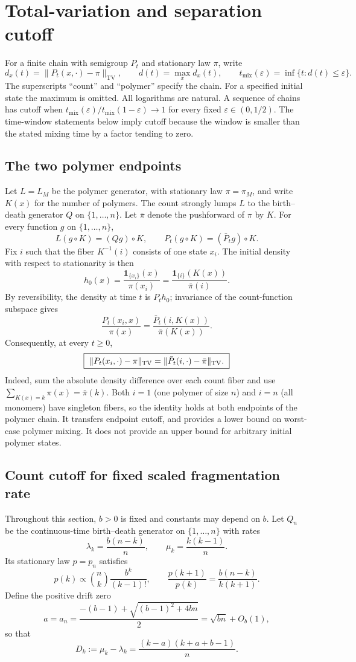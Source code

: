\section{Total-variation and separation cutoff}\label{sec:count-cutoff}

For a finite chain with semigroup $P_t$ and stationary law $\pi$, write
\[
 d_x(t)=\|P_t(x,\cdot)-\pi\|_{\mathrm{TV}},\qquad
 d(t)=\max_x d_x(t),\qquad
 t_{\mathrm{mix}}(\varepsilon)=\inf\{t:d(t)\le\varepsilon\}.
\]
The superscripts ``count'' and ``polymer'' specify the chain. For a
specified initial state the maximum is omitted. All logarithms are
natural. A sequence of chains has cutoff when
$t_{\mathrm{mix}}(\varepsilon)/t_{\mathrm{mix}}(1-\varepsilon)\to1$ for every
fixed $\varepsilon\in(0,1/2)$. The time-window statements below imply cutoff because the
window is smaller than the stated mixing time by a factor tending to
zero.

\subsection{The two polymer endpoints}
Let $L=L_M$ be the polymer generator, with stationary law $\pi=\pi_M$,
and write $K(x)$ for the number of polymers. The count strongly lumps
$L$ to the birth--death generator $Q$ on $\{1,\ldots,n\}$. Let $\bar\pi$ denote the pushforward of $\pi$ by $K$.
For every function $g$ on $\{1,\ldots,n\}$,
\[
 L(g\circ K)=(Qg)\circ K,
 \qquad P_t(g\circ K)=(\bar P_tg)\circ K.
\]
Fix $i$ such that the fiber $K^{-1}(i)$ consists of one state $x_i$.
The initial density with respect to stationarity is then
\[
 h_0(x)=\frac{\mathbf1_{\{x_i\}}(x)}{\pi(x_i)}
       =\frac{\mathbf1_{\{i\}}(K(x))}{\bar\pi(i)}.
\]
By reversibility, the density at time $t$ is $P_th_0$; invariance of the
count-function subspace gives
\[
 \frac{P_t(x_i,x)}{\pi(x)}
 =\frac{\bar P_t(i,K(x))}{\bar\pi(K(x))}.
\]
Consequently, at every $t\geq0$,
\[
 \boxed{\ \|P_t(x_i,\cdot)-\pi\|_{\rm TV}
       =\|\bar P_t(i,\cdot)-\bar\pi\|_{\rm TV}.\ }
\]
Indeed, sum the absolute density difference over each count fiber and use
$\sum_{K(x)=k}\pi(x)=\bar\pi(k)$. Both $i=1$ (one polymer of size $n$)
and $i=n$ (all monomers) have singleton fibers, so the identity holds at
both endpoints of the polymer chain. It transfers endpoint cutoff, and
provides a lower bound on worst-case polymer mixing. It does not provide
an upper bound for arbitrary initial polymer states.


\subsection{Count cutoff for fixed scaled fragmentation rate}
Throughout this section, $b>0$ is fixed and constants may depend on $b$.
Let $Q_n$ be the continuous-time birth--death generator on $\{1,\ldots,n\}$
with rates
\[
 \lambda_k=\frac{b(n-k)}n,\qquad \mu_k=\frac{k(k-1)}n.
\]
Its stationary law $p=p_n$ satisfies
\[
 p(k)\propto \binom nk\frac{b^k}{(k-1)!},\qquad
 \frac{p(k+1)}{p(k)}=\frac{b(n-k)}{k(k+1)}.
\]
Define the positive drift zero
\[
 a=a_n=\frac{-(b-1)+\sqrt{(b-1)^2+4bn}}2
       =\sqrt{bn}+O_b(1),
\]
so that
\[
 D_k:=\mu_k-\lambda_k
     =\frac{(k-a)(k+a+b-1)}n.
\]

